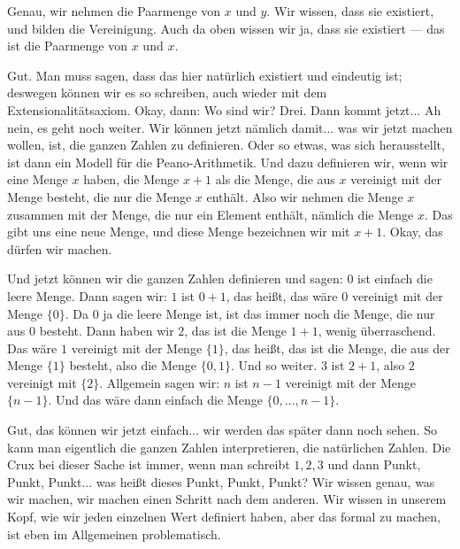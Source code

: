 \begin{spoken-clean}[00:17:17 - 00:20:01]
Genau, wir nehmen die Paarmenge von $x$ und $y$. Wir wissen, dass sie existiert, und bilden die Vereinigung. Auch da oben wissen wir ja, dass sie existiert --- das ist die Paarmenge von $x$ und $x$.

Gut. Man muss sagen, dass das hier natürlich existiert und eindeutig ist; deswegen können wir es so schreiben, auch wieder mit dem Extensionalitätsaxiom. Okay, dann: Wo sind wir? Drei. Dann kommt jetzt... Ah nein, es geht noch weiter. Wir können jetzt nämlich damit... was wir jetzt machen wollen, ist, die ganzen Zahlen zu definieren. Oder so etwas, was sich herausstellt, ist dann ein Modell für die Peano-Arithmetik. Und dazu definieren wir, wenn wir eine Menge $x$ haben, die Menge $x + 1$ als die Menge, die aus $x$ vereinigt mit der Menge besteht, die nur die Menge $x$ enthält. Also wir nehmen die Menge $x$ zusammen mit der Menge, die nur ein Element enthält, nämlich die Menge $x$. Das gibt uns eine neue Menge, und diese Menge bezeichnen wir mit $x + 1$. Okay, das dürfen wir machen.

Und jetzt können wir die ganzen Zahlen definieren und sagen: $0$ ist einfach die leere Menge. Dann sagen wir: $1$ ist $0 + 1$, das heißt, das wäre $0$ vereinigt mit der Menge $\{0\}$. Da $0$ ja die leere Menge ist, ist das immer noch die Menge, die nur aus $0$ besteht. Dann haben wir $2$, das ist die Menge $1 + 1$, wenig überraschend. Das wäre $1$ vereinigt mit der Menge $\{1\}$, das heißt, das ist die Menge, die aus der Menge $\{1\}$ besteht, also die Menge $\{0, 1\}$. Und so weiter. $3$ ist $2 + 1$, also $2$ vereinigt mit $\{2\}$. Allgemein sagen wir: $n$ ist $n-1$ vereinigt mit der Menge $\{n-1\}$. Und das wäre dann einfach die Menge $\{0, \dots, n-1\}$.

Gut, das können wir jetzt einfach... wir werden das später dann noch sehen. So kann man eigentlich die ganzen Zahlen interpretieren, die natürlichen Zahlen. Die Crux bei dieser Sache ist immer, wenn man schreibt $1, 2, 3$ und dann Punkt, Punkt, Punkt... was heißt dieses Punkt, Punkt, Punkt? Wir wissen genau, was wir machen, wir machen einen Schritt nach dem anderen. Wir wissen in unserem Kopf, wie wir jeden einzelnen Wert definiert haben, aber das formal zu machen, ist eben im Allgemeinen problematisch.
\end{spoken-clean}

